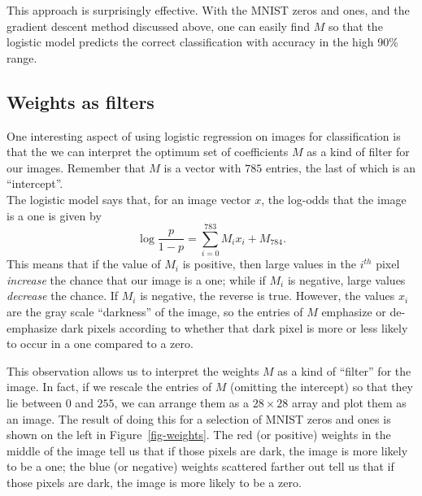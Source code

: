 \documentclass[
  11pt,
  letterpaper,
]{scrbook}
\theoremstyle{plain}
\theoremstyle{plain}
\theoremstyle{remark}
\begin{document}
This approach is surprisingly effective. With the MNIST zeros and ones,
and the gradient descent method discussed above, one can easily find
\(M\) so that the logistic model predicts the correct classification
with accuracy in the high 90\% range.

\hypertarget{weights-as-filters}{%
\subsection{Weights as filters}\label{weights-as-filters}}

One interesting aspect of using logistic regression on images for
classification is that the we can interpret the optimum set of
coefficients \(M\) as a kind of filter for our images. Remember that
\(M\) is a vector with \(785\) entries, the last of which is an
``intercept''.\\
The logistic model says that, for an image vector \(x\), the log-odds
that the image is a one is given by \[
\log \frac{p}{1-p} = \sum_{i=0}^{783} M_{i}x_{i} + M_{784}.
\] This means that if the value of \(M_{i}\) is positive, then large
values in the \(i^{th}\) pixel \emph{increase} the chance that our image
is a one; while if \(M_{i}\) is negative, large values \emph{decrease}
the chance. If \(M_{i}\) is negative, the reverse is true. However, the
values \(x_{i}\) are the gray scale ``darkness'' of the image, so the
entries of \(M\) emphasize or de-emphasize dark pixels according to
whether that dark pixel is more or less likely to occur in a one
compared to a zero.

This observation allows us to interpret the weights \(M\) as a kind of
``filter'' for the image. In fact, if we rescale the entries of \(M\)
(omitting the intercept) so that they lie between \(0\) and \(255\), we
can arrange them as a \(28\times 28\) array and plot them as an image.
The result of doing this for a selection of MNIST zeros and ones is
shown on the left in Figure~\ref{fig-weights}. The red (or positive)
weights in the middle of the image tell us that if those pixels are
dark, the image is more likely to be a one; the blue (or negative)
weights scattered farther out tell us that if those pixels are dark, the
image is more likely to be a zero.
\end{document}
